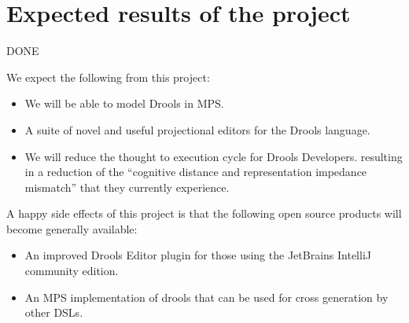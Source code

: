 \section{Expected results of the project} 
{\LARGE DONE}

We expect the following from this project:
\begin{itemize}
    \item We will be able to model Drools in MPS.
    \item A suite of novel and useful projectional editors for the Drools language.
    \item We will reduce the thought to execution cycle for Drools Developers. resulting in a reduction of the “cognitive distance and representation
    impedance mismatch” \cite{live_literals} that they currently experience.
\end{itemize}

A happy side effects of this project is that the following open source products will become generally available:
\begin{itemize}
    \item An improved Drools Editor plugin for those using the JetBrains IntelliJ community edition.
	\item An MPS implementation of drools that can be used for cross generation by other DSLs.
\end{itemize}

